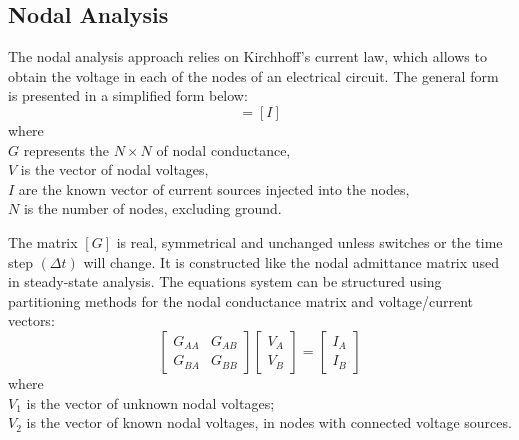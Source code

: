 

\subsection{Nodal Analysis}\label{subsec:ch3/sec5/sub1}
The nodal analysis approach relies on Kirchhoff’s current law, which allows to obtain the voltage in each of the nodes of an electrical circuit. The general form is presented in a simplified form below:
\begin{equation}
    [G][V]=[I]
\end{equation}
where\\  
$G$ represents the $N \times N$ of nodal conductance,\\
$V$ is the vector of nodal voltages,\\  
$I$ are the known vector of current sources injected into the nodes, \\
$N$ is the number of nodes, excluding ground.

The matrix $[G]$ is real, symmetrical and unchanged unless switches or the time step $(\Delta t)$ will change. It is constructed like the nodal admittance matrix used in steady-state analysis. The equations system can be structured using partitioning methods for the nodal conductance matrix and voltage/current vectors:
\begin{equation}
    \left[\begin{array}{ll}
G_{AA} & G_{AB} \\
G_{BA} & G_{BB}
\end{array}\right]\left[\begin{array}{l}
V_{A} \\
V_{B}
\end{array}\right]=\left[\begin{array}{l}
I_{A} \\
I_{B}
\end{array}\right]
\end{equation}
where\\
$V_1$ is the vector of unknown nodal voltages;\\
$V_2$ is the vector of known nodal voltages, in nodes with connected voltage sources.

